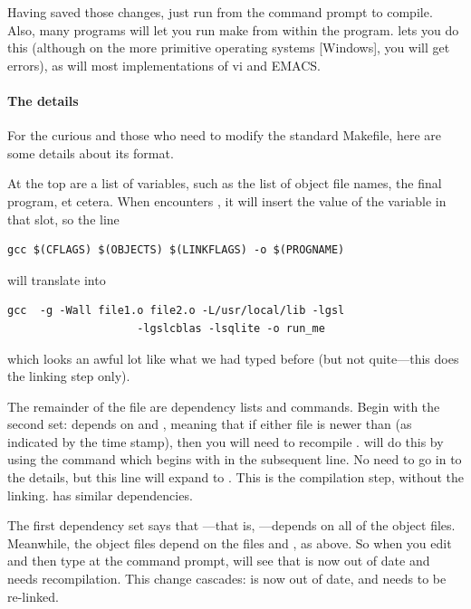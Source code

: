 \documentclass[12pt]{article}
\def\ind#1{\index{#1}#1}
\begin{document}
Having saved those changes, just run
 from the command prompt to compile.
Also, many programs will let you run
make from within the program.  lets you do this (although on
the more primitive operating systems [Windows], you will get errors),
as will most implementations of \ind{vi} and \ind{EMACS}.


\paragraph{The details} For the curious and those who need to modify
the standard Makefile, here are some details about its format.

At the top are a list of variables, such as the list of object file names, the final program, et cetera.
When  encounters , it will insert the value of the variable  in that
slot, so the line 
\begin{verbatim}
gcc $(CFLAGS) $(OBJECTS) $(LINKFLAGS) -o $(PROGNAME)
\end{verbatim}
will translate into
\begin{verbatim}
gcc  -g -Wall file1.o file2.o -L/usr/local/lib -lgsl 
                    -lgslcblas -lsqlite -o run_me
\end{verbatim}
which looks an awful lot like what we had typed before (but not quite---this does the linking step only).

The remainder of the file are dependency lists and commands. Begin
with the second set:  depends on  and , meaning that if either file is newer than 
(as indicated by the time stamp), then you will need to recompile .  will do this by using the command which begins with
 in the subsequent line. No need to go in to the details, but
this line will expand to . This
is the compilation step, without the linking.  has similar
dependencies.

The first dependency set says that ---that is, ---depends on all of the object files. Meanwhile, the object files
depend on the  files and , as above. So when
you edit  and then type  at the command prompt,
 will see that  is now out of date and needs
recompilation. This change cascades:  is now out of date,
and needs to be re-linked.
\end{document}
